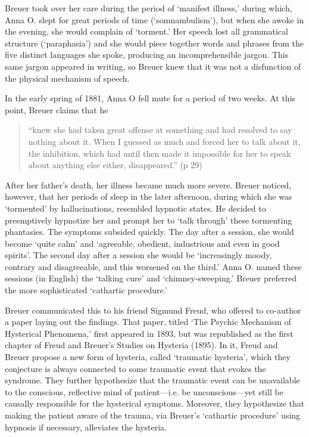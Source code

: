 Breuer took over her care during the period of `manifest illness,' during which, Anna O. slept for great periods of time (`somnambulism'), but when she awoke in the evening, she would complain of `torment.' Her speech lost all grammatical structure (`paraphasia') and she would piece together words and phrases from the five distinct languages she spoke, producing an incomprehensible jargon. This same jargon appeared in writing, so Breuer knew that it was not a disfunction of the physical mechanism of speech.

In the early spring of 1881, Anna O fell mute for a period of two weeks. At this point, Breuer claims that he 

\begin{quote}

“knew she had taken great offense at something and had resolved to say nothing about it. When I guessed as much and forced her to talk about it, the inhibition, which had until then made it impossible for her to speak about anything else either, disappeared.” (p 29)
\end{quote}

After her father's death, her illness became much more severe. Breuer noticed, however, that her periods of sleep in the later afternoon, during which she was `tormented' by hallucinations, resembled hypnotic states. He decided to preemptively hypnotize her and prompt her to `talk through' these tormenting phantasies. The symptoms subsided quickly. The day after a session, she would become `quite calm' and `agreeable, obedient, industrious and even in good spirits'. The second day after a session she would be `increasingly moody, contrary and disagreeable, and this worsened on the third.' Anna O. named these sessions (in English) the `talking cure' and `chimney-sweeping.' Breuer preferred the more sophisticated `cathartic procedure.'

Breuer communicated this to his friend Sigmund Freud, who offered to co-author a paper laying out the findings. That paper, titled `The Psychic Mechanism of Hysterical Phenomena,' first appeared in 1893, but was republished as the first chapter of Freud and Breuer's Studies on Hysteria (1895). In it, Freud and Breuer propose a new form of hysteria, called `traumatic hysteria', which they conjecture is always connected to some traumatic event that evokes the syndrome. They further hypothesize that the traumatic event can be unavailable to the conscious, reflective mind of patient---i.e. be unconscious---yet still be causally responsible for the hysterical symptoms. Moreover, they hypothesize that making the patient aware of the trauma, via Breuer’s `cathartic procedure' using hypnosis if necessary, alleviates the hysteria.

